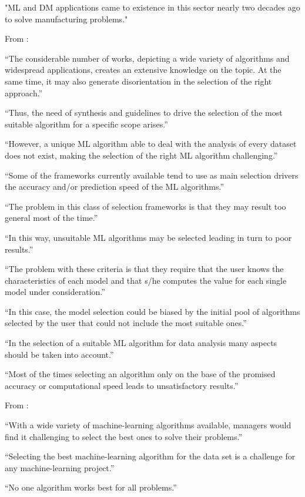 "ML and DM applications came to existence in this sector nearly two decades ago to solve manufacturing problems."

From \parencite{sala2018selecting_ml_algorithm} :

“The considerable number of works, depicting a wide variety of algorithms and widespread applications, creates an extensive knowledge on the topic. At the same time, it may also generate disorientation in the selection of the right approach.”

“Thus, the need of synthesis and guidelines to drive the selection of the most suitable algorithm for a specific scope arises.”

“However, a unique ML algorithm able to deal with the analysis of every dataset does not exist, making the selection of the right ML algorithm challenging.”

“Some of the frameworks currently available tend to use as main selection drivers the accuracy and/or prediction speed of the ML algorithms.”

“The problem in this class of selection frameworks is that they may result too general most of the time.”

“In this way, unsuitable ML algorithms may be selected leading in turn to poor results.”

“The problem with these criteria is that they require that the user knows the characteristics of each model and that s/he computes the value for each single model under consideration.”

“In this case, the model selection could be biased by the initial pool of algorithms selected by the user that could not include the most suitable ones.”

“In the selection of a suitable ML algorithm for data analysis many aspects should be taken into account.”

“Most of the times selecting an algorithm only on the base of the promised accuracy or computational speed leads to unsatisfactory results.”

From \parencite{lee2020machine_learning_enterprises} :

“With a wide variety of machine-learning algorithms available, managers would find it challenging to select the best ones to solve their problems.”

“Selecting the best machine-learning algorithm for the data set is a challenge for any machine-learning project.”

“No one algorithm works best for all problems.”

